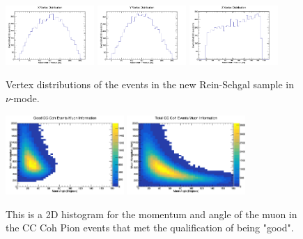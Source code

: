 \documentclass[11pt]{article}
\begin{document}
\begin{figure}[H]
\centering
\includegraphics[width=0.3\textwidth]{NewNMReinSehgalImages/4-XVertexDistributionNMRS.png}
\includegraphics[width=0.3\textwidth]{NewNMReinSehgalImages/3-YVertexDistributionNMRS.png}
\includegraphics[width=0.3\textwidth]{NewNMReinSehgalImages/2-ZVertexDistributionNMRS.png}
\caption{Vertex distributions of the events in the new Rein-Sehgal sample in $\nu$-mode.}
\end{figure}

\begin{figure}[H]
\centering
\includegraphics[width=0.4\textwidth]{NewNMReinSehgalImages/6-GoodCCCohMuonInfoNMRS.png}
\includegraphics[width=0.4\textwidth]{NewNMReinSehgalImages/9-TotalCCCohMuonInfoNMRS.png}
\caption{This is a 2D histogram for the momentum and angle of the muon in the CC Coh Pion events that met the qualification of being "good".}
\end{figure}
\end{document}
